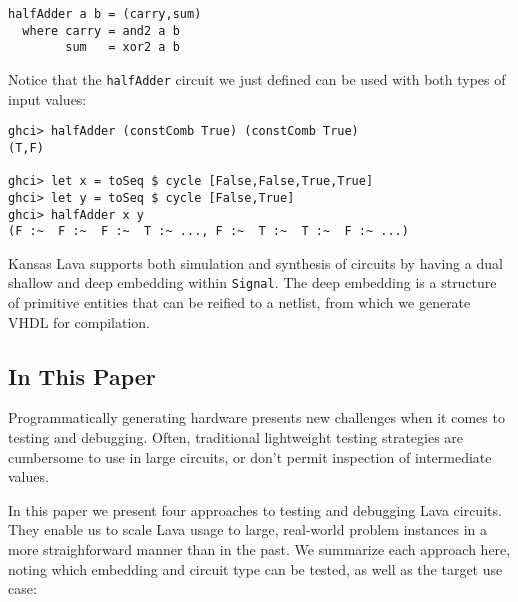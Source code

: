 \documentclass{llncs}
\begin{document}
\begin{verbatim}
halfAdder a b = (carry,sum)
  where carry = and2 a b
        sum   = xor2 a b
\end{verbatim}

Notice that the \verb!halfAdder! circuit we just defined can be used with
both types of input values:

\begin{verbatim}
ghci> halfAdder (constComb True) (constComb True)                                            
(T,F)

ghci> let x = toSeq $ cycle [False,False,True,True]
ghci> let y = toSeq $ cycle [False,True]
ghci> halfAdder x y
(F :~  F :~  F :~  T :~ ..., F :~  T :~  T :~  F :~ ...)
\end{verbatim}

Kansas Lava supports both simulation and synthesis of circuits by having a dual
shallow and deep embedding within \verb!Signal!. The deep embedding is a
structure of primitive entities that can be reified to a netlist, from which
we generate VHDL for compilation.

\subsection{In This Paper}

Programmatically generating hardware presents new challenges when it comes
to testing and debugging. Often, traditional lightweight testing strategies
are cumbersome to use in large circuits, or don't permit inspection of
intermediate values.

In this paper we present four approaches to testing and debugging
Lava circuits. They enable us to scale Lava usage to large, real-world
problem instances in a more straighforward manner than in the past.
We summarize each approach here, noting which embedding and
circuit type can be tested, as well as the target use case:
\end{document}
